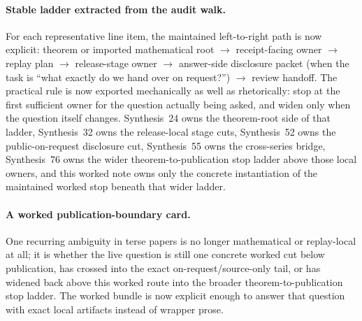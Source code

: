 \documentclass[11pt]{article}
\begin{document}
\paragraph{Stable ladder extracted from the audit walk.}
For each representative line item, the maintained left-to-right path is now explicit: theorem or imported mathematical root $\to$ receipt-facing owner $\to$ replay plan $\to$ release-stage owner $\to$ answer-side disclosure packet (when the task is ``what exactly do we hand over on request?'') $\to$ review handoff.
The practical rule is now exported mechanically as well as rhetorically: stop at the first sufficient owner for the question actually being asked, and widen only when the question itself changes.
Synthesis~24 owns the theorem-root side of that ladder, Synthesis~32 owns the release-local stage cuts, Synthesis~52 owns the public-on-request disclosure cut, Synthesis~55 owns the cross-series bridge, Synthesis~76 owns the wider theorem-to-publication stop ladder above those local owners, and this worked note owns only the concrete instantiation of the maintained worked stop beneath that wider ladder.\cite{series:mathcrosswalk,series:releasespine,series:challengeanswerdisclosurepackets,series:seriesspines,series:theoremtopublicationspine}

\paragraph{A worked publication-boundary card.}
One recurring ambiguity in terse papers is no longer mathematical or replay-local at all; it is whether the live question is still one concrete worked cut below publication, has crossed into the exact on-request/source-only tail, or has widened back above this worked route into the broader theorem-to-publication stop ladder. The worked bundle is now explicit enough to answer that question with exact local artifacts instead of wrapper prose.\cite{series:challengeanswerdisclosurepackets,series:challengeanswerreviewmenus,series:publicrequestresponsepacketrefreshresponsepacketclosureverdicts,series:pairedterminalcutoverrules,series:theoremtopublicationspine}
\end{document}
